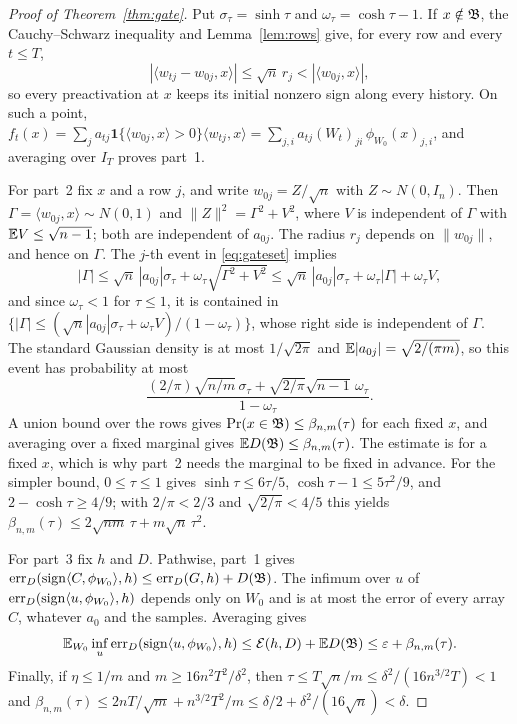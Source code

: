 \documentclass[11pt,letterpaper,pmlr,twoside]{jmlr}
\newcommand{\err}{\operatorname{err}}\newcommand{\Risk}{\mathcal E}
\newcommand{\ind}{\mathbf1}\newcommand{\eps}{\varepsilon}
\newcommand{\ip}[2]{\langle #1,#2\rangle}\newcommand{\norm}[1]{\lVert #1\rVert}
\begin{document}
\begin{proof}[Proof of Theorem~\ref{thm:gate}]
Put $\sigma_\tau=\sinh\tau$ and $\omega_\tau=\cosh\tau-1$. If $x\notin\mathfrak B$, the Cauchy--Schwarz inequality and Lemma~\ref{lem:rows} give, for every row and every $t\le T$,
\[
 |\ip{w_{tj}-w_{0j}}x|\le\sqrt n\,r_j<|\ip{w_{0j}}x|,
\]
so every preactivation at $x$ keeps its initial nonzero sign along every history. On such a point, $f_t(x)=\sum_ja_{tj}\ind\{\ip{w_{0j}}x>0\}\ip{w_{tj}}x=\sum_{j,i}a_{tj}(W_t)_{ji}\,\phi_{W_0}(x)_{j,i}$, and averaging over $I_T$ proves part~1.

For part~2 fix $x$ and a row $j$, and write $w_{0j}=Z/\sqrt n$ with $Z\sim N(0,I_n)$. Then $\Gamma=\ip{w_{0j}}x\sim N(0,1)$ and $\norm Z^2=\Gamma^2+V^2$, where $V$ is independent of $\Gamma$ with $\mathbb E V\le\sqrt{n-1}$; both are independent of $a_{0j}$. The radius $r_j$ depends on $\norm{w_{0j}}$, and hence on $\Gamma$. The $j$-th event in \eqref{eq:gateset} implies
\[
 |\Gamma|\le\sqrt n\,|a_{0j}|\sigma_\tau+\omega_\tau\sqrt{\Gamma^2+V^2}\le\sqrt n\,|a_{0j}|\sigma_\tau+\omega_\tau|\Gamma|+\omega_\tau V,
\]
and since $\omega_\tau<1$ for $\tau\le1$, it is contained in $\{|\Gamma|\le(\sqrt n|a_{0j}|\sigma_\tau+\omega_\tau V)/(1-\omega_\tau)\}$, whose right side is independent of $\Gamma$. The standard Gaussian density is at most $1/\sqrt{2\pi}$ and $\mathbb E|a_{0j}|=\sqrt{2/(\pi m)}$, so this event has probability at most
\[
 \frac{(2/\pi)\sqrt{n/m}\,\sigma_\tau+\sqrt{2/\pi}\sqrt{n-1}\,\omega_\tau}{1-\omega_\tau}.
\]
A union bound over the rows gives $\Pr(x\in\mathfrak B)\le \beta_{n,m}(\tau)$ for each fixed $x$, and averaging over a fixed marginal gives $\mathbb E D(\mathfrak B)\le \beta_{n,m}(\tau)$. The estimate is for a fixed $x$, which is why part~2 needs the marginal to be fixed in advance. For the simpler bound, $0\le\tau\le1$ gives $\sinh\tau\le6\tau/5$, $\cosh\tau-1\le5\tau^2/9$, and $2-\cosh\tau\ge4/9$; with $2/\pi<2/3$ and $\sqrt{2/\pi}<4/5$ this yields $\beta_{n,m}(\tau)\le2\sqrt{nm}\,\tau+m\sqrt n\,\tau^2$.

For part~3 fix $h$ and $D$. Pathwise, part~1 gives $\err_D(\sgn\ip C{\phi_{W_0}},h)\le\err_D(G,h)+D(\Bfr)$. The infimum over $u$ of $\err_D(\sgn\ip u{\phi_{W_0}},h)$ depends only on $W_0$ and is at most the error of every array $C$, whatever $a_0$ and the samples. Averaging gives
\[
 \E_{W_0}\inf_u\err_D(\sgn\ip u{\phi_{W_0}},h)\le\Risk(h,D)+\E D(\Bfr)\le\eps+\beta_{n,m}(\tau).
\]
Finally, if $\eta\le1/m$ and $m\ge16n^2T^2/\delta^2$, then $\tau\le T\sqrt n/m\le\delta^2/(16n^{3/2}T)<1$ and $\beta_{n,m}(\tau)\le2nT/\sqrt m+n^{3/2}T^2/m\le\delta/2+\delta^2/(16\sqrt n)<\delta$.
\end{proof}
\end{document}
